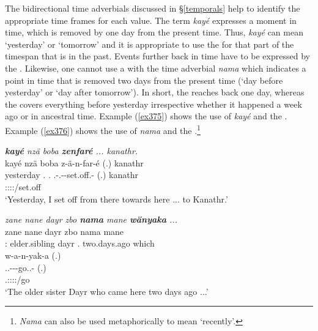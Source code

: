 The bidirectional time adverbials discussed in \S{}\ref{temporals} help to identify the appropriate time frames for each  value. The term \emph{kayé} expresses a moment in time, which is removed by one day from the present time. Thus, \emph{kayé} can mean `yesterday' or `tomorrow' and it is appropriate to use the  for that part of the timespan that is in the past. Events further back in time have to be expressed by the  . Likewise, one cannot use a  with the time adverbial \emph{nama} which indicates a point in time that is removed two days from the present time (`day before yesterday' or `day after tomorrow'). In short, the  reaches back one day, whereas the   covers everything before yesterday irrespective whether it happened a week ago or in ancestral time. Example (\ref{ex375}) shows the use of \emph{kayé} and the . Example (\ref{ex376}) shows the use of \emph{nama} and the  .\footnote{\emph{Nama} can also be used metaphorically to mean `recently'.}

\begin{exe}
  	\ex \emph{\textbf{kayé} nzä boba \textbf{zenfaré} ... kanathr.}\\
  	\glll kayé nzä boba z-ä-n-far-é (.) kanathr\\
	yesterday \Fsg.\Abs{} \Med.\Abl{} \M.\Gam-\Vc.\Ndu-\Venit-set.off.\Ext-\Fsg{} (.) kanathr\\
 	{} {} {} \footnotesize{\Fsg:\Sbj:\Rpst:\Pfv:\Venit/set.off} {} {}\\
  	\trans `Yesterday, I set off from there towards here ... to Kanathr.'\\
  	\label{ex375}
\end{exe}
\begin{exe}
	\ex \emph{zane nane dayr zbo \textbf{nama} mane \textbf{wänyaka} ...}\\
	\gll zane nane dayr zbo nama mane\\
	\Dem:\Prox{} elder.sibling dayr \Prox.\All{} two.days.ago which\\
	\sn
	\glll w-a-n-yak-a (.)\\
	\Tsg.\F.\Alph-\Vc-\Venit-go.\Ext.\Ndu-\Pst{} (.)\\
	\footnotesize{\Tsg.\F:\Sbj:\Pst:\Ipfv:\Venit/go} {}\\
	\trans `The older sister Dayr who came here two days ago ...'\\
	\label{ex376}
\end{exe}

